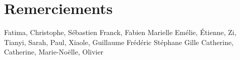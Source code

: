 
\chapter{Remerciements}
Fatima, Christophe, Sébastien
Franck, Fabien
Marielle
Emélie, 
Étienne, Zi, Tianyi, Sarah, Paul, Xiaole, Guillaume
Frédéric Stéphane Gille 
Catherine, Catherine, Marie-Noëlle, Olivier

%
%
%
